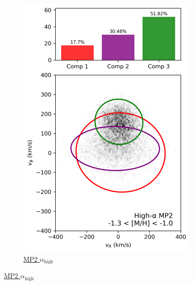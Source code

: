 \documentclass[a4paper,10pt]{article}
\begin{document}
\begin{multicols}{2}
\begin{figure}[H]
\begin{subfigure}[t]{0.24\linewidth}
    \includegraphics[width=\linewidth]{../figures/gmm_mp2_high_alpha_k6.png}
    \caption{\href{https://raw.githack.com/raunaq-rai/Disentangling-the-Milky-Way-using-GMM/main/figures/MP2\_high\_\_\_-1.3\%5BM\_H\%5D-1.0.html}{MP2 $\alpha_{\mathrm{high}}$}}
    \label{fig:mp2_hi}
  \end{subfigure}

  \vspace{0.5em}


\end{figure}
\end{multicols}
\end{document}

